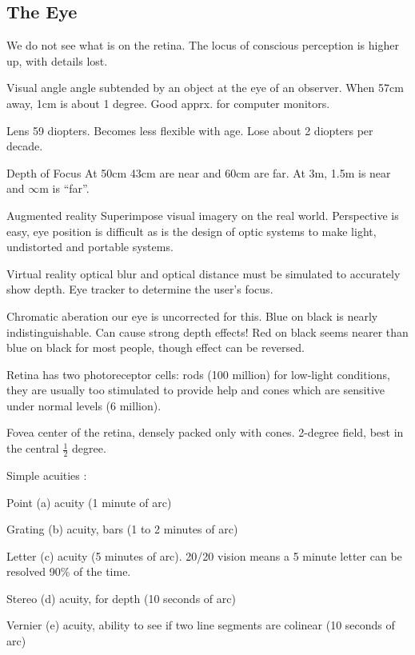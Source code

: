 \begin{mdframed}\begin{multicols}{2}
\subsection{The Eye}
    We do not see what is on the retina. The locus of conscious
    perception is higher up, with details lost.
\begin{compactdesc}
\item[Visual angle] angle subtended by an object at the eye of an observer.
    When 57cm away, 1cm is about 1 degree. Good apprx. for computer monitors.
\item[Lens] 59 diopters. Becomes less flexible with age. Lose about 2
    diopters per decade.
\item[Depth of Focus] At 50cm 43cm are near and 60cm are far. At 3m, 1.5m is
    near and $\infty$m is ``far''.
\item[Augmented reality] Superimpose visual imagery on the real world.
    Perspective is easy, eye position is difficult as is the design of
    optic systems to make light, undistorted and portable systems.
\item[Virtual reality] optical blur and optical distance must be simulated
    to accurately show depth. Eye tracker to determine the user's focus.
\item[Chromatic aberation] our eye is uncorrected for this. Blue on black is
    nearly indistinguishable. Can cause strong depth effects! Red on black
    seems nearer than blue on black for most people, though effect can be
    reversed.
\item[Retina] has two photoreceptor cells: rods (100 million) for low-light
    conditions, they are usually too stimulated to provide help and cones which
    are sensitive under normal levels (6 million).
\item[Fovea] center of the retina, densely packed only with cones. 2-degree
    field, best in the central $\frac{1}{2}$ degree.
\item[Simple acuities]:
    \begin{compactdesc}
    \item[Point (a)] acuity (1 minute of arc)
    \item[Grating (b)] acuity, bars (1 to 2 minutes of arc)
    \item[Letter (c)] acuity (5 minutes of arc). 20/20 vision means a 5 minute
        letter can be resolved 90\% of the time.
    \item[Stereo (d)] acuity, for depth (10 seconds of arc)
    \item[Vernier (e)] acuity, ability to see if two line segments are colinear
        (10 seconds of arc)
    \end{compactdesc}


\end{compactdesc}
\end{multicols}
\end{mdframed}

